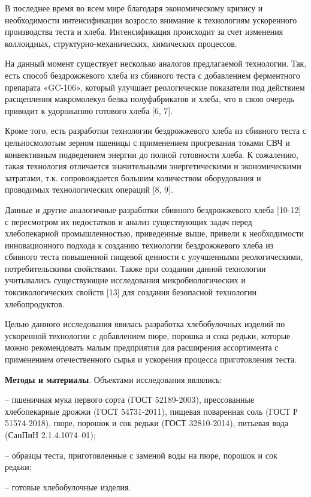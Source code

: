 \begin{multicols}{2}
В последнее время во всем мире благодаря экономическому кризису и
необходимости интенсификации возросло внимание к технологиям ускоренного
производства теста и хлеба. Интенсификация происходит за счет изменения
коллоидных, структурно-механических, химических процессов.

На данный момент существует несколько аналогов предлагаемой технологии.
Так, есть способ бездрожжевого хлеба из сбивного теста с добавлением
ферментного препарата «GC-106», который улучшает реологические
показатели под действием расщепления макромолекул белка полуфабрикатов и
хлеба, что в свою очередь приводит к удорожанию готового хлеба {[}6,
7{]}.

Кроме того, есть разработки технологии бездрожжевого хлеба из сбивного
теста с цельносмолотым зерном пшеницы с применением прогревания токами
СВЧ и конвективным подведением энергии до полной готовности хлеба. К
сожалению, такая технология отличается значительными энергетическими и
экономическими затратами, т.к. сопровождается большим количеством
оборудования и проводимых технологических операций {[}8, 9{]}.

Данные и другие аналогичные разработки сбивного бездрожжевого хлеба
{[}10-12{]} с пересмотром их недостатков и анализ существующих задач
перед хлебопекарной промышленностью, приведенные выше, привели к
необходимости инновационного подхода к созданию технологии бездрожжевого
хлеба из сбивного теста повышенной пищевой ценности с улучшенными
реологическими, потребительскими свойствами. Также при создании данной
технологии учитывались существующие исследования микробиологических и
токсикологических свойств {[}13{]} для создания безопасной технологии
хлебопродуктов.

Целью данного исследования явилась разработка хлебобулочных изделий по
ускоренной технологии с добавлением пюре, порошка и сока редьки, которые
можно рекомендовать малым предприятия для расширения ассортимента с
применением отечественного сырья и ускорения процесса приготовления
теста.

{\bfseries Методы и материалы}. Объектами исследования являлись:

-- пшеничная мука первого сорта (ГОСТ 52189-2003), прессованные
хлебопекарные дрожжи (ГОСТ 54731-2011), пищевая поваренная соль (ГОСТ Р
51574-2018), пюре, порошок и сок редьки (ГОСТ 32810-2014), питьевая вода
(СанПиН 2.1.4.1074--01);

-- образцы теста, приготовленные с заменой воды на пюре, порошок и сок
редьки;

-- готовые хлебобулочные изделия.


\end{multicols}
